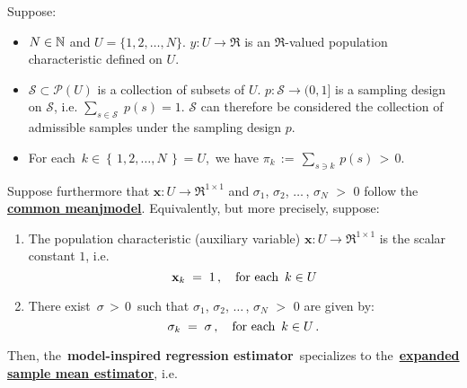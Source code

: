 \begin{corollary}
\mbox{}
\vskip 0.05cm
\noindent
Suppose:
\begin{itemize}
\item
	$N \in \mathbb{N}$ and $U = \{1,2,\ldots,N\}$.
	\vskip 0.05cm
	$y : U \longrightarrow \Re$ is an $\Re$-valued population characteristic defined on $U$.
\item
	$\mathcal{S} \subset \mathcal{P}(U)$ is a collection of subsets of $U$.
	$p : \mathcal{S} \longrightarrow (0,1]$ is a sampling design on $\mathcal{S}$,
	i.e. $\underset{s\in\mathcal{S}}{\sum}\;p(s) = 1$.
	\vskip 0.05cm
	$\mathcal{S}$ can therefore be considered the collection of admissible samples under the sampling design $p$.
\item
	For each \,$k \in \left\{\,1,2,\ldots,N\,\right\} = U$,\, we have
	$\pi_{k} \,:=\, \underset{s \ni k}{\sum}\,p(s) \,>\, 0$.
\end{itemize}
Suppose furthermore that
$\mathbf{x} : U \longrightarrow \Re^{1 \times 1}$ and
$\sigma_{1}$, $\sigma_{2}$, $\ldots$\,, $\sigma_{N}$ $>$ $0$
follow the \,\underline{\textbf{{\color{red}common mean}{\color{white}j}model}}.
\renewcommand{\theenumi}{\alph{enumi}}
\renewcommand{\labelenumi}{\textnormal{(\theenumi)}$\;\;$}
\vskip 0.1cm
\noindent
Equivalently, but more precisely, suppose:
\begin{enumerate}
\item \vskip -0.10cm
	The population characteristic (auxiliary variable)
	$\mathbf{x} : U \longrightarrow \Re^{1 \times 1}$ is the scalar constant $1$, i.e.
	\begin{equation*}
	\mathbf{x}_{k}
		\; = \; 1\,,
	\quad\textnormal{for each \,$k \in U$}
	\end{equation*}
\item
	There exist \,$\sigma \,>\, 0$\, such that
	$\sigma_{1}$, $\sigma_{2}$, $\ldots$\,, $\sigma_{N}$ $>$ $0$ are given by:
	\begin{equation*}
	\sigma_{k} \; = \; \sigma\,,
	\quad\textnormal{for each \,$k \in U$}\,.
	\end{equation*}
\end{enumerate}
\renewcommand{\theenumi}{\roman{enumi}}
\renewcommand{\labelenumi}{\textnormal{(\theenumi)}$\;\;$}
Then, the \,\textbf{model-inspired regression estimator}\,
specializes to the \,\underline{\textbf{{\color{red}expanded sample mean} estimator}}, i.e.
\begin{eqnarray*}

\end{eqnarray*}
\end{corollary}
